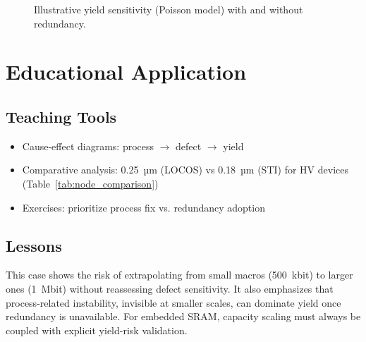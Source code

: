 \documentclass[conference]{IEEEtran}
\begin{document}
\begin{figure}[!t]
  \centering
  \caption{Illustrative yield sensitivity (Poisson model) with and without redundancy.}
  \label{fig:yield}
\end{figure}

\section{Educational Application}
\subsection{Teaching Tools}
\begin{itemize}
    \item Cause-effect diagrams: process $\rightarrow$ defect $\rightarrow$ yield
    \item Comparative analysis: 0.25~µm (LOCOS) vs 0.18~µm (STI) for HV devices (Table~\ref{tab:node_comparison})
    \item Exercises: prioritize process fix vs. redundancy adoption
\end{itemize}

\subsection{Lessons}
This case shows the risk of extrapolating from small macros (500~kbit) to larger ones (1~Mbit) without reassessing defect sensitivity.  
It also emphasizes that process-related instability, invisible at smaller scales, can dominate yield once redundancy is unavailable.  
For embedded SRAM, capacity scaling must always be coupled with explicit yield-risk validation.
\end{document}
